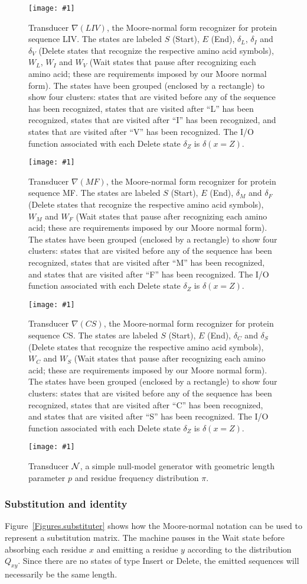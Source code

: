 \documentclass{article}
\newcommand{\figref}[1]{Figure~\ref{Figures.#1}}
\newcommand{\figlabel}[1]{\label{Figures.#1}}
\newcommand{\easyfig}[4]{
\begin{figure}
\texttt{[image: \#1]}
\caption{ \figlabel{#3} #4}
\end{figure}}
\newcommand{\pdffig}[2]{\easyfig{#1-fig.pdf}{}{#1}{#2}}
\newcommand{\tallpdffig}[2]{\easyfig{#1-fig.pdf}{height=\textheight}{#1}{#2}}
\newcommand\nullmodel{{\cal N}}
\newcommand\recognize{\nabla}
\begin{document}
\tallpdffig{liv-labeled}{Transducer $\recognize(LIV)$, the Moore-normal form recognizer for protein sequence LIV.
The states are labeled $S$ (Start), $E$ (End),
$\delta_L$, $\delta_I$ and $\delta_V$ (Delete states that recognize the respective amino acid symbols),
$W_L$, $W_I$ and $W_V$ (Wait states that pause after recognizing each amino acid;
these are requirements imposed by our Moore normal form).
The states have been grouped (enclosed by a rectangle) to show four clusters:
 states that are visited before any of the sequence has been recognized,
 states that are visited after ``L'' has been recognized,
 states that are visited after ``I'' has been recognized,
and
 states that are visited after ``V'' has been recognized.
The I/O function associated with each Delete state $\delta_Z$ is $\delta(x=Z)$.}
\pdffig{mf-labeled}{Transducer $\recognize(MF)$, the Moore-normal form recognizer for protein sequence MF.
The states are labeled $S$ (Start), $E$ (End),
$\delta_M$ and $\delta_F$ (Delete states that recognize the respective amino acid symbols),
$W_M$ and $W_F$ (Wait states that pause after recognizing each amino acid;
these are requirements imposed by our Moore normal form).
The states have been grouped (enclosed by a rectangle) to show four clusters:
 states that are visited before any of the sequence has been recognized,
 states that are visited after ``M'' has been recognized,
and
 states that are visited after ``F'' has been recognized.
The I/O function associated with each Delete state $\delta_Z$ is $\delta(x=Z)$.}
\pdffig{cs-labeled}{Transducer $\recognize(CS)$, the Moore-normal form recognizer for protein sequence CS.
The states are labeled $S$ (Start), $E$ (End),
$\delta_C$ and $\delta_S$ (Delete states that recognize the respective amino acid symbols),
$W_C$ and $W_S$ (Wait states that pause after recognizing each amino acid;
these are requirements imposed by our Moore normal form).
The states have been grouped (enclosed by a rectangle) to show four clusters:
 states that are visited before any of the sequence has been recognized,
 states that are visited after ``C'' has been recognized,
and
 states that are visited after ``S'' has been recognized.
The I/O function associated with each Delete state $\delta_Z$ is $\delta(x=Z)$.}
\pdffig{null-model}{Transducer $\nullmodel$, a simple null-model generator with geometric length parameter $p$ and residue frequency distribution $\pi$.}

\subsubsection{Substitution and identity}
\figref{substituter} shows how the Moore-normal notation can be  used to represent a substitution matrix.  
The machine pauses in the Wait state before absorbing each residue $x$ and emitting a residue $y$
according to the distribution $Q_{xy}$.  
Since there are no states of type Insert or Delete, the emitted sequences will necessarily
be the same length.  
\end{document}
